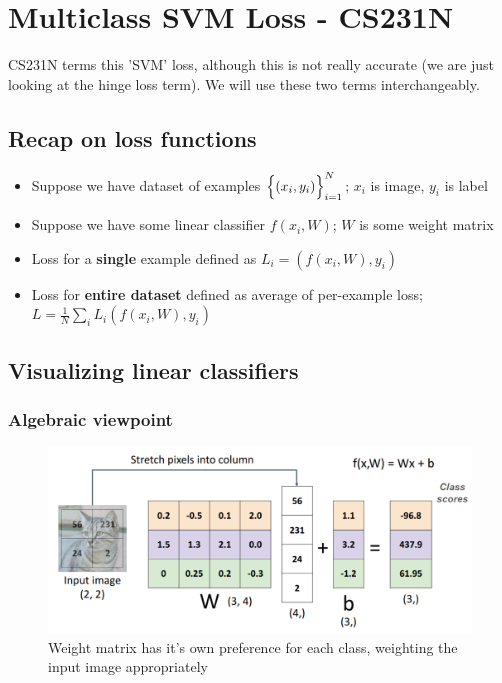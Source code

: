 \documentclass{article}
\begin{document}
\newpage
\section{Multiclass SVM Loss - CS231N}
CS231N terms this 'SVM' loss, although this is not really accurate (we are just looking at the hinge loss term). We will use these two terms interchangeably.

\subsection{Recap on loss functions}
\begin{itemize}
    \item Suppose we have dataset of examples $\Bigl\{(x_{i}, y_{i})\Bigr\}^{N}_{i=1}$; $x_{i}$ is image, $y_{i}$ is label
    \item Suppose we have some linear classifier $f(x_{i},W)$; $W$ is some weight matrix
    \item Loss for a \textbf{single} example defined as $L_{i} = (f(x_{i},W),y_{i})$
    \item Loss for \textbf{entire dataset} defined as average of per-example loss; $L = \frac{1}{N}\sum_{i}L_{i}(f(x_{i},W),y_{i})$
\end{itemize}

\subsection{Visualizing linear classifiers}
\subsubsection{Algebraic viewpoint}
\begin{figure}[htp]
    \centering
    \includegraphics[width=12cm, scale=1]{images/algebraicViewpoint.PNG}
    \caption{Weight matrix has it's own preference for each class, weighting the input image appropriately}
\end{figure}
\end{document}
